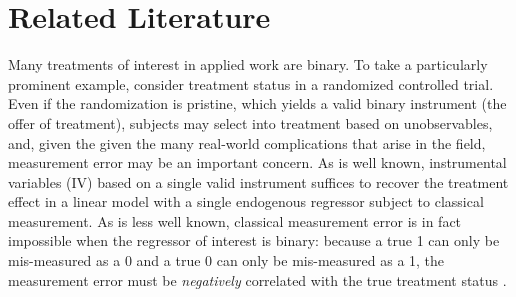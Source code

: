 \section{Related Literature}
Many treatments of interest in applied work are binary.
To take a particularly prominent example, consider treatment status in a randomized controlled trial.
Even if the randomization is pristine, which yields a valid binary instrument (the offer of treatment), subjects may select into treatment based on unobservables, and, given the given the many real-world complications that arise in the field, measurement error may be an important concern.
As is well known, instrumental variables (IV) based on a single valid instrument suffices to recover the treatment effect in a linear model with a single endogenous regressor subject to classical measurement.
As is less well known, classical measurement error is in fact impossible when the regressor of interest is binary: because a true 1 can only be mis-measured as a 0 and a true 0 can only be mis-measured as a 1, the measurement error must be \emph{negatively} correlated with the true treatment status \citep{Aigner,Bollinger}. 

